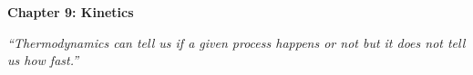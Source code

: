 \renewcommand{\theequation}{9.\arabic{equation}}

\begin{frame}
\begin{center}
{\bf Chapter 9: Kinetics}\\
\end{center}

\scriptsize

\vspace*{3cm}

\begin{center}
\textit{``Thermodynamics can tell us if a given process happens or not but it does not tell us how fast.''}
\end{center}

\end{frame}

\scriptsize









